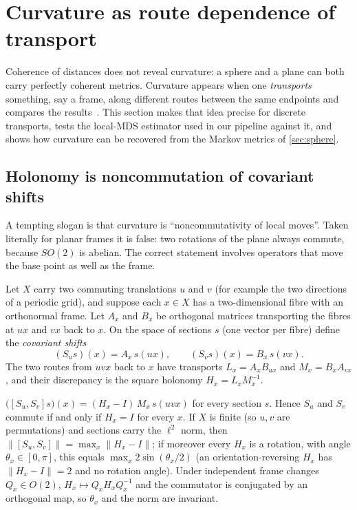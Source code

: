 \section{Curvature as route dependence of transport}
\label{sec:curvature}

Coherence of distances does not reveal curvature: a sphere and a plane can both carry perfectly coherent metrics.
Curvature appears when one \emph{transports} something, say a frame, along different routes between the same endpoints and compares the results~\cite{Lee1997Riemannian}.
This section makes that idea precise for discrete transports, tests the local-MDS estimator used in our pipeline against it, and shows how curvature can be recovered from the Markov metrics of \cref{sec:sphere}.

\subsection{Holonomy is noncommutation of covariant shifts}
\label{sec:connection}

A tempting slogan is that curvature is ``noncommutativity of local moves''.
Taken literally for planar frames it is false: two rotations of the plane always commute, because $SO(2)$ is abelian.
The correct statement involves operators that move the base point as well as the frame.

Let $X$ carry two commuting translations $u$ and $v$ (for example the two directions of a periodic grid), and suppose each $x\in X$ has a two-dimensional fibre with an orthonormal frame.
Let $A_x$ and $B_x$ be orthogonal matrices transporting the fibres at $ux$ and $vx$ back to $x$.
On the space of sections $s$ (one vector per fibre) define the \emph{covariant shifts}
\begin{equation}
(S_us)(x)=A_x\,s(ux),\qquad (S_vs)(x)=B_x\,s(vx).
\end{equation}
The two routes from $uvx$ back to $x$ have transports $L_x=A_xB_{ux}$ and $M_x=B_xA_{vx}$, and their discrepancy is the square holonomy $H_x=L_xM_x^{-1}$.

\begin{theorem}
\label{thm:commutator}
$\bigl([S_u,S_v]s\bigr)(x)=(H_x-I)\,M_x\,s(uvx)$ for every section $s$.
Hence $S_u$ and $S_v$ commute if and only if $H_x=I$ for every $x$.
If $X$ is finite (so $u,v$ are permutations) and sections carry the $\ell^2$ norm, then $\|[S_u,S_v]\|=\max_x\|H_x-I\|$; if moreover every $H_x$ is a rotation, with angle $\theta_x\in[0,\pi]$, this equals $\max_x 2\sin(\theta_x/2)$ (an orientation-reversing $H_x$ has $\|H_x-I\|=2$ and no rotation angle).
Under independent frame changes $Q_x\in O(2)$, $H_x\mapsto Q_xH_xQ_x^{-1}$ and the commutator is conjugated by an orthogonal map, so $\theta_x$ and the norm are invariant.
\end{theorem}

